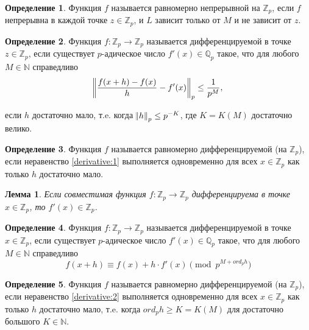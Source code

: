 \documentclass[master, och, diploma, times]{sty/SCWorks}
\theoremstyle{plain}
\newtheorem{lemma}{Лемма}
\theoremstyle{definition}
\newtheorem{defn}{Определение}[section]
\begin{document}
\begin{defn}
Функция $f$ называется равномерно непрерывной на $\mathbb {Z}_p$, если $f$ непрерывна в каждой точке $z \in \mathbb {Z}_p$, и $L$ зависит только от $M$ и не зависит от $z$.\cite{bib:analysis:ciocan}
\end{defn}


\begin{defn}
Функция $f:\mathbb {Z}_p \rightarrow \mathbb {Z}_p$ называется дифференцируемой в точке $z \in \mathbb {Z}_p$, если существует $p$-адическое число $f'(x) \in \mathbb {Q}_p$ такое, что для любого $M \in \mathbb {N}$ справедливо
\begin{equation} \label{derivative:1}
	\norm{\frac{f(x+h)-f(x)}{h} - f'(x)}_p \le \frac{1}{p^M},
\end{equation}

\noindent если $h$ достаточно мало, т.e. когда $\norm{h}_p \le p^{-K}$, где $K=K(M)$ достаточно велико.
\end{defn}

\begin{defn}
Функция $f$ называется равномерно дифференцируемой (на $\mathbb {Z}_p$), если неравенство \eqref{derivative:1} выполняется одновременно для всех $x \in \mathbb {Z}_p$ как только $h$ достаточно мало. \cite{bib:analysis:anashin:en}
\end{defn}

\begin{lemma}
Если совместимая функция $f:\mathbb {Z}_p \rightarrow \mathbb {Z}_p$ дифференцируема в точке $x \in \mathbb {Z}_p$, то $f'(x) \in \mathbb {Z}_p$.
\end{lemma}

\begin{defn}
Функция $f:\mathbb {Z}_p \rightarrow \mathbb {Z}_p$ называется дифференцируемой в точке $x \in \mathbb {Z}_p$, если существует $p$-адическое число $f'(x) \in \mathbb {Q}_p$ такое, что для любого $M \in \mathbb {N}$ справедливо
\begin{equation} \label{derivative:2}
	f(x+h) \equiv f(x) + h \cdot f'(x) \pmod p^{M + ord_p h}
\end{equation}
\end{defn}

\begin{defn}
Функция $f$ называется равномерно дифференцируемой (на $\mathbb {Z}_p$), если неравенство \eqref{derivative:2} выполняется одновременно для всех $x \in \mathbb {Z}_p$ как только $h$ достаточно мало, т.e. когда $ord_p h \ge K=K(M)$ для достаточно большого $K \in \mathbb {N}$.
\end{defn}
\end{document}
